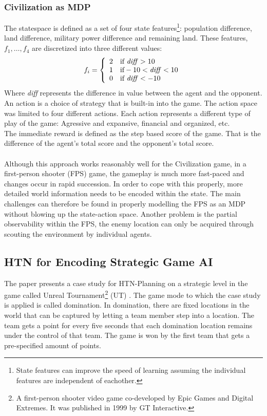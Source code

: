 \subsubsection{Civilization as MDP}
The statespace is defined as a set of four state features\footnote{State
features can improve the speed of learning assuming the individual features are
independent of eachother.}: population difference, land difference, military
power difference and remaining land. These features, $f_1,\ldots,f_4$ are
discretized into three different values:
\begin{displaymath}
f_i = \left\{ \begin{array}{ll}
2 & \textrm{if \emph{diff}} > 10\\
1 & \textrm{if} -10 < \textrm{\emph{diff}} < 10\\
0 & \textrm{if \emph{diff}} < -10
\end{array} \right.
\end{displaymath}
Where \emph{diff} represents the difference in value between the agent and the
opponent.\\
An action is a choice of strategy that is built-in into the game. The action
space was limited to four different actions.  Each action represents a
different type of play of the game: Agressive and expansive, financial and
organized, etc.\\
The immediate reward is defined as the step based score of the game. That is
the difference of the agent's total score and the opponent's total score.
\\\\
Although this approach works reasonably well for the Civilization game, in a
first-person shooter (FPS) game, the gameplay is much more fast-paced and
changes occur in rapid succession. In order to cope with this properly, more
detailed world information needs to be encoded within the state. The main
challenges can therefore be found in properly modelling the FPS as an MDP
without blowing up the state-action space. Another problem is the partial
observability within the FPS, the enemy location can only be acquired through
scouting the environment by individual agents.


\subsection{HTN for Encoding Strategic Game AI}
The paper presents a case study for HTN-Planning on a strategic level in the
game called Unreal Tournament\footnote{A first-person shooter video game
co-developed by Epic Games and Digital Extremes. It was published in 1999 by GT
Interactive.} (UT) \cite{ut}. The game mode to which the case study is applied
is called domination. In domination, there are fixed locations in the world
that can be captured by letting a team member step into a location. The team
gets a point for every five seconds that each domination location remains under
the control of that team. The game is won by the first team that gets a
pre-specified amount of points.

